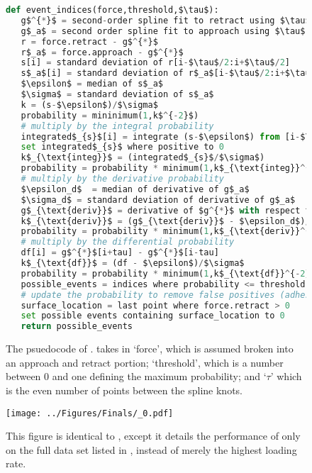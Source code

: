 \begin{figure}[htp]
\caption[\name{} psuedocode]{\noindent{}\pStartF The psuedocode of \name{}. \name{} takes in `force', which is assumed broken into an approach and retract portion; `threshold', which is a number between 0 and one defining the maximum probability; and `$\tau$' which is the even number of points between the spline knots. \pEndF }
  \begin{lstlisting}[language=Python]
def event_indices(force,threshold,$\tau$):
   g$^{*}$ = second-order spline fit to retract using $\tau$ for knots
   g$_a$ = second order spline fit to approach using $\tau$ for knots
   r = force.retract - g$^{*}$
   r$_a$ = force.approach - g$^{*}$
   s[i] = standard deviation of r[i-$\tau$/2:i+$\tau$/2]
   s$_a$[i] = standard deviation of r$_a$[i-$\tau$/2:i+$\tau$/2]
   $\epsilon$ = median of s$_a$
   $\sigma$ = standard deviation of s$_a$
   k = (s-$\epsilon$)/$\sigma$
   probability = mininimum(1,k$^{-2}$)
   # multiply by the integral probability 
   integrated$_{s}$[i] = integrate (s-$\epsilon$) from [i-$\tau$] to [i+$\tau$]
   set integrated$_{s}$ where positive to 0
   k$_{\text{integ}}$ = (integrated$_{s}$/$\sigma$)
   probability = probability * minimum(1,k$_{\text{integ}}^{-2}$)
   # multiply by the derivative probability
   $\epsilon_d$  = median of derivative of g$_a$
   $\sigma_d$ = standard deviation of derivative of g$_a$
   g$_{\text{deriv}}$ = derivative of $g^{*}$ with respect to time
   k$_{\text{deriv}}$ = (g$_{\text{deriv}}$ - $\epsilon_d$)/$\sigma_d$
   probability = probability * minimum(1,k$_{\text{deriv}}^{-2}$)
   # multiply by the differential probability 
   df[i] = g$^{*}$[i+tau] - g$^{*}$[i-tau]
   k$_{\text{df}}$ = (df - $\epsilon$)/$\sigma$
   probability = probability * minimum(1,k$_{\text{df}}^{-2}$)
   possible_events = indices where probability <= threshold
   # update the probability to remove false positives (adhesions)
   surface_location = last point where force.retract > 0
   set possible events containing surface_location to 0
   return possible_events
\end{lstlisting}
\end{figure}

\clearpage


\begin{figure}[htp]
\caption[Performance of \name{} on larger data set]{\noindent{}\pStartF This figure is identical to , except it details the performance of only \name{} on the full data set listed in , instead of merely the highest loading rate.  \pEndF }
\centering
\texttt{[image: ../Figures/Finals/\_0.pdf]}%
\end{figure}

